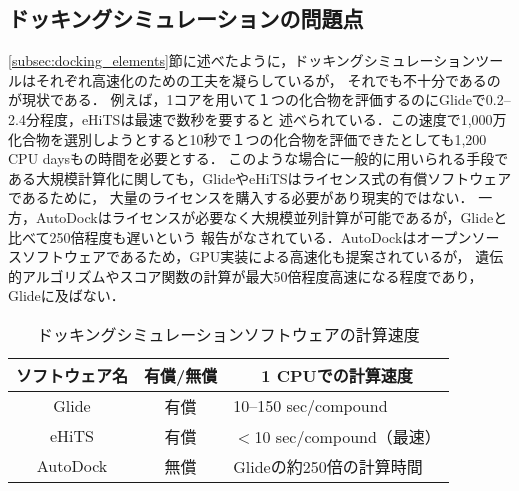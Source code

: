 
\subsection{ドッキングシミュレーションの問題点}\label{subsec:docking_problem}
\ref{subsec:docking_elements}節に述べたように，ドッキングシミュレーションツールはそれぞれ高速化のための工夫を凝らしているが，
それでも不十分であるのが現状である．
例えば，1コアを用いて１つの化合物を評価するのにGlideで0.2--2.4分程度\cite{Friesner2004}，eHiTSは最速で数秒\cite{Zsoldos2007}を要すると
述べられている．この速度で1,000万化合物を選別しようとすると10秒で１つの化合物を評価できたとしても1,200 CPU daysもの時間を必要とする．
このような場合に一般的に用いられる手段である大規模計算化に関しても，GlideやeHiTSはライセンス式の有償ソフトウェアであるために，
大量のライセンスを購入する必要があり現実的ではない．
一方，AutoDockはライセンスが必要なく大規模並列計算が可能であるが，Glideと比べて250倍程度も遅いという
報告がなされている\cite{Tuccinardi2010}．AutoDockはオープンソースソフトウェアであるため，GPU実装による高速化も提案されているが，
遺伝的アルゴリズムやスコア関数の計算が最大50倍程度高速になる程度であり\cite{Kannan2010}，Glideに及ばない．

\begin{table}[htb] \centering
	\caption{ドッキングシミュレーションソフトウェアの計算速度}
	\label{table:docking_tools}
	\begin{tabular}{c|cl}
	\hline
	ソフトウェア名					&有償/無償				&\multicolumn{1}{c}{1 CPUでの計算速度} 					\\ \hline
	Glide							&有償						&10--150 sec/compound\cite{Friesner2004}				\\
	eHiTS							&有償						&$<$10 sec/compound（最速）\cite{Zsoldos2007}			\\
	AutoDock					&無償						&Glideの約250倍の計算時間\cite{Tuccinardi2010}		\\ \hline
	\end{tabular}
\end{table}

